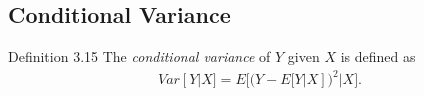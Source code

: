 %
%
%
%
%
%
\subsection{Conditional Variance}
\begin{boks}{Definition 3.15}
  The \textit{conditional variance} of $Y$ given $X$ is defined as
  \begin{align*}
    Var[Y|X] = E\Big[(Y - E[Y|X])^2|X\Big].
  \end{align*}
\end{boks}

